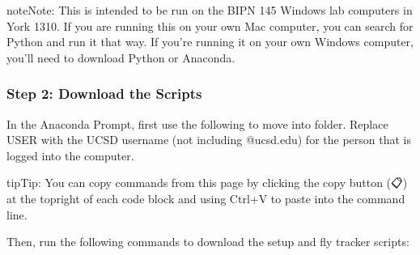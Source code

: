 \documentclass[letterpaper,10pt,english]{jupyterBook}
\begin{document}
\begin{sphinxadmonition}{note}{Note:}
\sphinxAtStartPar
This is intended to be run on the BIPN 145 Windows lab computers in York 1310. If you are running this on your own Mac computer, you can search for Python and run it that way. If you’re running it on your own Windows computer, you’ll need to download Python or Anaconda.
\end{sphinxadmonition}


\subsubsection{Step 2: Download the Scripts}
\label{\detokenize{FlyTracking/Script:step-2-download-the-scripts}}
\sphinxAtStartPar
In the Anaconda Prompt, first use the following to move into  folder. Replace USER with the UCSD username (not including @ucsd.edu) for the person that is logged into the computer.

\begin{sphinxadmonition}{tip}{Tip:}
\sphinxAtStartPar
{} You can copy commands from this page by clicking the copy button (📋) at the top\sphinxhyphen{}right of each code block and using Ctrl+V to paste into the command line.
\end{sphinxadmonition}

\begin{sphinxVerbatim}[commandchars=\\\{\}]
 \PYGZbs{}\PYGZbs{}
\end{sphinxVerbatim}

\sphinxAtStartPar
Then, run the following commands to download the setup and fly tracker scripts:

\begin{sphinxVerbatim}[commandchars=\\\{\}]
   
\end{sphinxVerbatim}

\begin{sphinxVerbatim}[commandchars=\\\{\}]
   
\end{sphinxVerbatim}
\end{document}
